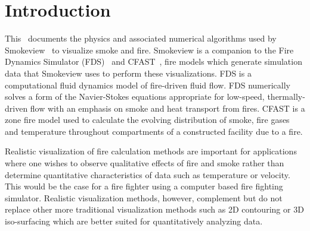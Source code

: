 


\section{Introduction}
This \paper\ documents the physics and associated numerical algorithms used by Smokeview~\cite{Smokeview_Users_Guide} to visualize smoke and fire.  Smokeview is a companion to the Fire Dynamics Simulator (FDS)~\cite{FDS_Math_Guide} and CFAST~\cite{Jones:2009}, fire models which generate   simulation data that Smokeview uses to perform these visualizations. FDS is a computational fluid dynamics model of fire-driven fluid flow. FDS numerically solves a form of the Navier-Stokes equations appropriate for low-speed, thermally-driven flow with an emphasis on smoke and heat transport from fires.  CFAST is a zone fire model used to calculate the evolving distribution of smoke, fire gases and temperature throughout compartments of a constructed facility due to a fire.

Realistic visualization of fire calculation methods are important for applications where one wishes to observe qualitative effects of fire and smoke rather than determine quantitative characteristics of data such as temperature or velocity.  This would be the case for a fire fighter using a computer based fire fighting simulator. Realistic visualization methods, however, complement but do not replace other more traditional visualization methods such as 2D contouring or 3D iso-surfacing which are better suited for quantitatively analyzing data.

